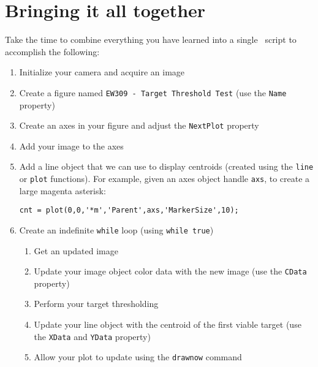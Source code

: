 \documentclass{tufte-handout}
\begin{document}
\section{Bringing it all together}
Take the time to combine everything you have learned into a single \Matlab\ script to accomplish the following:
\begin{enumerate}
\item Initialize your camera and acquire an image
\item Create a figure named \lstinline{EW309 - Target Threshold Test} (use the \lstinline{Name} property) 
\item Create an axes in your figure and adjust the \lstinline{NextPlot} property
\item Add your image to the axes
\item Add a line object that we can use to display centroids (created using the \lstinline{line} or \lstinline{plot} functions). For example, given an axes object handle \lstinline{axs}, to create a large magenta asterisk: 
\begin{lstlisting}[style=usnaMatlab]
cnt = plot(0,0,'*m','Parent',axs,'MarkerSize',10);
\end{lstlisting}
\item Create an indefinite \lstinline{while} loop (using \lstinline{while true})
\begin{enumerate}
\item Get an updated image
\item Update your image object color data with the new image (use the \lstinline{CData} property)
\item Perform your target thresholding
\item Update your line object with the centroid of the first viable target (use the \lstinline{XData} and \lstinline{YData} property)
\item Allow your plot to update using the \lstinline{drawnow} command
\end{enumerate}
\end{enumerate}
\end{document}

